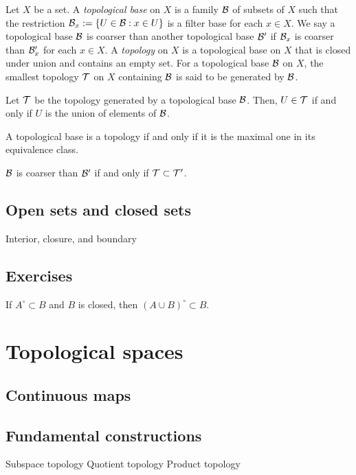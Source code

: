 \documentclass{../../large}
\begin{document}
\begin{prb}[Topologies]
Let $X$ be a set.
A \emph{topological base} on $X$ is a family $\mathcal{B}$ of subsets of $X$ such that the restriction $\mathcal{B}_x:=\{U\in\mathcal{B}:x\in U\}$ is a filter base for each $x\in X$.
We say a topological base $\mathcal{B}$ is coarser than another topological base $\mathcal{B}'$ if $\mathcal{B}_x$ is coarser than $\mathcal{B}'_x$ for each $x\in X$.
A \emph{topology} on $X$ is a topological base on $X$ that is closed under union and contains an empty set.
For a topological base $\mathcal{B}$ on $X$, the smallest topology $\mathcal{T}$ on $X$ containing $\mathcal{B}$ is said to be generated by $\mathcal{B}$.
\begin{parts}
\item Let $\mathcal{T}$ be the topology generated by a topological base $\mathcal{B}$. Then, $U\in\mathcal{T}$ if and only if $U$ is the union of elements of $\mathcal{B}$.
\item A topological base is a topology if and only if it is the maximal one in its equivalence class.
\item $\mathcal{B}$ is coarser than $\mathcal{B}'$ if and only if $\mathcal{T}\subset\mathcal{T}'$.
\end{parts}
\end{prb}

\section{Open sets and closed sets}
Interior, closure, and boundary


\section*{Exercises}

\begin{prb}
If $A^\circ\subset B$ and $B$ is closed, then $(A\cup B)^\circ\subset B$.
\end{prb}




\chapter{Topological spaces}
\section{Continuous maps}

\section{Fundamental constructions}
Subspace topology
Quotient topology
Product topology
\end{document}
